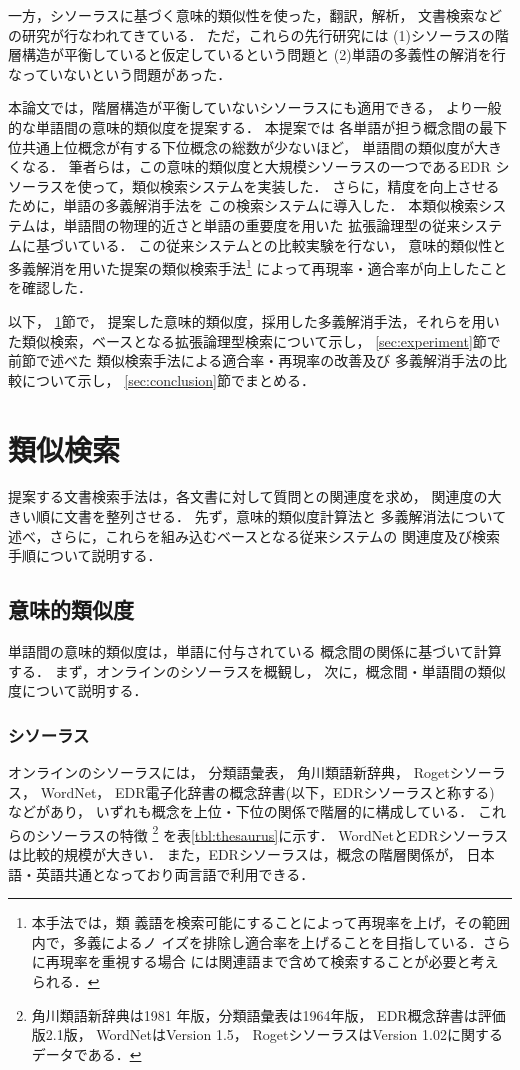   一方，シソーラスに基づく意味的類似性を使った，翻訳，解析，
文書検索などの研究が行なわれてきている．
 ただ，これらの先行研究には
(1)シソーラスの階層構造が平衡していると仮定しているという問題と
(2)単語の多義性の解消を行なっていないという問題があった．

 本論文では，階層構造が平衡していないシソーラスにも適用できる，
 より一般的な単語間の意味的類似度を提案する．
 本提案では
 各単語が担う概念間の最下位共通上位概念が有する下位概念の総数が少ないほど，
   単語間の類似度が大きくなる．
 筆者らは，この意味的類似度と大規模シソーラスの一つであるEDR
 シソーラスを使って，類似検索システムを実装した．
 さらに，精度を向上させるために，単語の多義解消手法を
 この検索システムに導入した．
 本類似検索システムは，単語間の物理的近さと単語の重要度を用いた
 拡張論理型の従来システムに基づいている．
 この従来システムとの比較実験を行ない，
 意味的類似性と多義解消を用いた提案の類似検索手法\footnote{本手法では，類
 義語を検索可能にすることによって再現率を上げ，その範囲内で，多義によるノ
 イズを排除し適合率を上げることを目指している．さらに再現率を重視する場合
 には関連語まで含めて検索することが必要と考えられる．} 
 によって再現率・適合率が向上したことを確認した． 

以下，
\ref{sec:method}節で，
提案した意味的類似度，採用した多義解消手法，それらを用い
た類似検索，ベースとなる拡張論理型検索について示し，
\ref{sec:experiment}節で前節で述べた
類似検索手法による適合率・再現率の改善及び
多義解消手法の比較について示し，
\ref{sec:conclusion}節でまとめる．

\section{類似検索} \label{sec:method}
  提案する文書検索手法は，各文書に対して質問との関連度を求め，
関連度の大きい順に文書を整列させる．
先ず，意味的類似度計算法と
多義解消法について述べ，さらに，これらを組み込むベースとなる従来システムの
関連度及び検索手順について説明する．


\subsection{意味的類似度}\label{sec:sim-word-main}
  単語間の意味的類似度は，単語に付与されている
概念間の関係に基づいて計算する．
まず，オンラインのシソーラスを概観し，
次に，概念間・単語間の類似度について説明する．

\subsubsection{シソーラス}\label{sec:thesaurus}
  オンラインのシソーラスには，
分類語彙表\cite{Kokugoken64}，
角川類語新辞典\cite{Ohno81}，
Rogetシソーラス\cite{Chapman77}，
WordNet\cite{Miller90}，
EDR電子化辞書\cite{EDR93}の概念辞書(以下，EDRシソーラスと称する)
などがあり，
いずれも概念を上位・下位の関係で階層的に構成している．
  これらのシソーラスの特徴
\footnote{角川類語新辞典は1981
年版，分類語彙表は1964年版，
EDR概念辞書は評価版2.1版，
WordNetはVersion 1.5，
RogetシソーラスはVersion 1.02に関するデータである．}
を表\ref{tbl:thesaurus}に示す．
WordNetとEDRシソーラスは比較的規模が大きい．
また，EDRシソーラスは，概念の階層関係が，
日本語・英語共通となっており両言語で利用できる．

